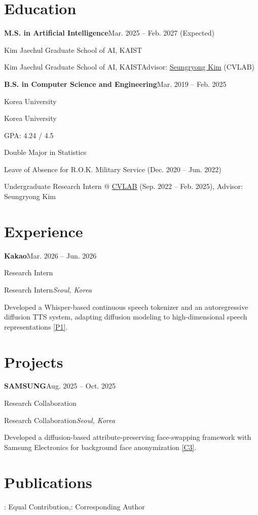 \documentclass[11pt,letterpaper]{article}
\makeatletter
\newcommand{\cv@line}[2]{{\parfillskip=0pt\relax\noindent#1\hfill#2\null\par}}
\newcommand{\cventry}[4]{%
  \cv@line{\textbf{#1}}{#2}%
  \def\cv@second{#3}%
  \ifx\cv@second\@empty\else
    \vspace{-7pt}%
    \cv@line{#3}{#4}%
  \fi
  \vspace{-5pt}%
}
\newcommand{\publegend}{%
  {\color{cvgray}\small *: Equal Contribution,\quad \dag: Corresponding Author}\par
  \vspace{4pt}%
}
\newcommand{\pubgroup}[1]{%
  \vspace{2pt}{\Large\bfseries #1}\par
  \nobreak\vspace{2pt}\nobreak
}
\newcommand{\largesection}[1]{\vspace{1pt} \section{\LARGE#1} \vspace{1pt}}
\makeatother
\begin{document}
\largesection{Education}
\cventry{M.S. in Artificial Intelligence}{Mar. 2025 -- Feb. 2027 (Expected)}
        {Kim Jaechul Graduate School of AI, KAIST}{Advisor: \href{https://cvlab.kaist.ac.kr}{Seungryong Kim} (CVLAB)}
\vspace{2pt}
\cventry{B.S. in Computer Science and Engineering}{Mar. 2019 -- Feb. 2025}
        {Korea University}{}
\begin{cvbullets}
  \item GPA: 4.24 / 4.5
  \item Double Major in Statistics
  \item Leave of Absence for R.O.K. Military Service (Dec. 2020 -- Jun. 2022)
  \item Undergraduate Research Intern @ \href{https://cvlab.kaist.ac.kr}{CVLAB}
        (Sep. 2022 -- Feb. 2025), Advisor: Seungryong Kim
\end{cvbullets}

\largesection{Experience}
\cventry{Kakao}{Mar. 2026 -- Jun. 2026}{Research Intern}{\textit{Seoul, Korea}}
\begin{cvbullets}
  \item Developed a Whisper-based continuous speech tokenizer and an autoregressive diffusion TTS system, adapting diffusion modeling to high-dimensional speech representations \hyperref[Whisper]{[P1]}.
\end{cvbullets}

\largesection{Projects}
\cventry{SAMSUNG}{Aug. 2025 -- Oct. 2025}{Research Collaboration}{\textit{Seoul, Korea}}
\begin{cvbullets}
  \item Developed a diffusion-based attribute-preserving face-swapping framework with Samsung Electronics for background face anonymization \hyperref[APPLE]{[C3]}.
\end{cvbullets}


\clearpage
\largesection{Publications}
\publegend


\pubgroup{International Conference}
\end{document}

